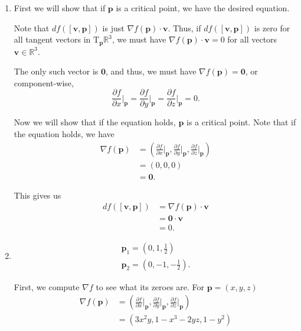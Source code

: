 \documentclass[12 pt, letterpaper]{hmcpset}
\begin{document}
\begin{solution}
	\begin{enumerate}
		\item 
			First we will show that if $\mathbf p$ is a critical point, we have the desired equation. 

			Note that $df([\mathbf v, \mathbf p])$ is just $\nabla f(\mathbf p) \cdot \mathbf v$. Thus, if $df([\mathbf v, \mathbf p])$ is zero for all tangent vectors in $\mathrm T_{\mathbf p} \mathbb R^3$, we must have $\nabla f(\mathbf p) \cdot \mathbf v = 0$ for all vectors $\mathbf v \in \mathbb R^3$. 

			The only such vector is $\mathbf 0$, and thus, we must have $\nabla f(\mathbf p) = \mathbf 0$, or component-wise,
			\[
				\frac{\partial f}{\partial x} \Big |_{\mathbf p} = \frac{\partial f}{\partial y} \Big |_{\mathbf p} = \frac{\partial f}{\partial z} \Big |_{\mathbf p} = 0.
			\] 

			Now we will show that if the equation holds, $\mathbf p$ is a critical point. Note that if the equation holds, we have
			\[
				\begin{split}
					\nabla f(\mathbf p) & = \left ( \frac{\partial f}{\partial x} \Big |_{\mathbf p}, \frac{\partial f}{\partial y} \Big |_{\mathbf p}, \frac{\partial f}{\partial z} \Big |_{\mathbf p} \right ) \\
							    & = (0, 0, 0) \\
							    & = \mathbf 0.
				\end{split}
			\] 

			This gives us
			\[
				\begin{split}
					df([\mathbf v, \mathbf p]) & = \nabla f(\mathbf p) \cdot \mathbf v \\
								   & = \mathbf 0 \cdot \mathbf v \\
								   & = 0.
				\end{split}
			\]
		\item
			\[
				\boxed{
					\begin{gathered}
						\mathbf p_1 = \left ( 0, 1, \frac{1}{2} \right ) \\
						\mathbf p_2 = \left ( 0, -1, -\frac{1}{2} \right ).
					\end{gathered}
				}
			\] 

			First, we compute $\nabla f$ to see what its zeroes are. For $\mathbf p = (x, y, z)$
			\[
				\begin{split}
					\nabla f(\mathbf p) & = \left ( \frac{\partial f}{\partial x} \Big |_{\mathbf p}, \frac{\partial f}{\partial y} \Big |_{\mathbf p}, \frac{\partial f}{\partial z} \Big |_{\mathbf p} \right ) \\
							    & = (3 x^2 y, 1 - x^3 - 2y z, 1 - y^2)
				\end{split}
			\] 


\end{enumerate}
\end{solution}
\end{document}
